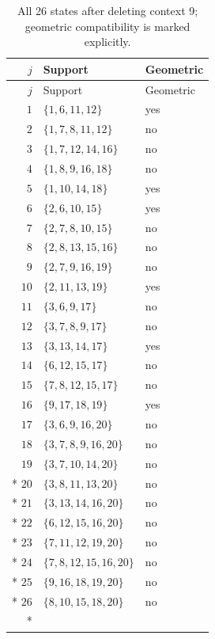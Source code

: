 \documentclass[aps,pra,reprint,superscriptaddress,longbibliography,nofootinbib,floatfix,10pt]{revtex4-2}
\theoremstyle{definition}
\begin{document}
\begin{longtable}{rll}
\caption{All 26 states after deleting context 9; geometric compatibility is marked explicitly.}\label{tab:cabello-eight-context-states}\\
\toprule
$j$ & Support & Geometric\\\midrule
\endfirsthead
\toprule
$j$ & Support & Geometric\\\midrule
\endhead
\bottomrule\endfoot
$1$ & $\{1,6,11,12\}$ & yes\\
$2$ & $\{1,7,8,11,12\}$ & no\\
$3$ & $\{1,7,12,14,16\}$ & no\\
$4$ & $\{1,8,9,16,18\}$ & no\\
$5$ & $\{1,10,14,18\}$ & yes\\
$6$ & $\{2,6,10,15\}$ & yes\\
$7$ & $\{2,7,8,10,15\}$ & no\\
$8$ & $\{2,8,13,15,16\}$ & no\\
$9$ & $\{2,7,9,16,19\}$ & no\\
$10$ & $\{2,11,13,19\}$ & yes\\
$11$ & $\{3,6,9,17\}$ & no\\
$12$ & $\{3,7,8,9,17\}$ & no\\
$13$ & $\{3,13,14,17\}$ & yes\\
$14$ & $\{6,12,15,17\}$ & no\\
$15$ & $\{7,8,12,15,17\}$ & no\\
$16$ & $\{9,17,18,19\}$ & yes\\
$17$ & $\{3,6,9,16,20\}$ & no\\
$18$ & $\{3,7,8,9,16,20\}$ & no\\
$19$ & $\{3,7,10,14,20\}$ & no\\*
$20$ & $\{3,8,11,13,20\}$ & no\\*
$21$ & $\{3,13,14,16,20\}$ & no\\*
$22$ & $\{6,12,15,16,20\}$ & no\\*
$23$ & $\{7,11,12,19,20\}$ & no\\*
$24$ & $\{7,8,12,15,16,20\}$ & no\\*
$25$ & $\{9,16,18,19,20\}$ & no\\*
$26$ & $\{8,10,15,18,20\}$ & no\\*
\end{longtable}
\endgroup
\end{document}
